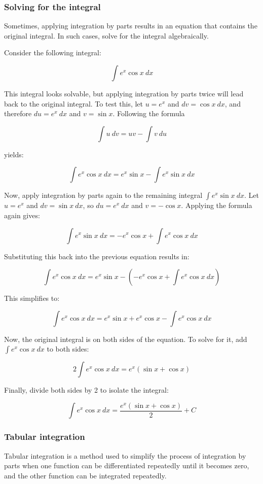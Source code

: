 \documentclass[letterpaper, 12pt]{article}
\begin{document}
\subsubsection*{Solving for the integral}

Sometimes, applying integration by parts results in an equation that contains the original integral. In such cases, solve for the integral algebraically.

Consider the following integral:

$$\int e^x \cos x \: dx$$

This integral looks solvable, but applying integration by parts twice will lead back to the original integral. To test this, let $u = e^x$ and $dv = \cos x \: dx$, and therefore $du = e^x \: dx$ and $v = \sin x$. Following the formula 

$$ \int u \: dv = uv - \int v \: du $$

yields:

$$ \int e^x \cos x \: dx = e^x \sin x - \int e^x \sin x \: dx $$

Now, apply integration by parts again to the remaining integral $\int e^x \sin x \: dx$. Let $u = e^x$ and $dv = \sin x \: dx$, so $du = e^x \: dx$ and $v = -\cos x$. Applying the formula again gives:

$$ \int e^x \sin x \: dx = -e^x \cos x + \int e^x \cos x \: dx $$

Substituting this back into the previous equation results in:

$$ \int e^x \cos x \: dx = e^x \sin x - \left( -e^x \cos x + \int e^x \cos x \: dx \right) $$

This simplifies to:

$$ \int e^x \cos x \: dx = e^x \sin x + e^x \cos x - \int e^x \cos x \: dx $$

Now, the original integral is on both sides of the equation. To solve for it, add $\int e^x \cos x \: dx$ to both sides:

$$ 2 \int e^x \cos x \: dx = e^x (\sin x + \cos x) $$

Finally, divide both sides by 2 to isolate the integral:

$$ \int e^x \cos x \: dx = \boxed{\frac{e^x (\sin x + \cos x)}{2} + C} $$

\subsubsection*{Tabular integration}

Tabular integration is a method used to simplify the process of integration by parts when one function can be differentiated repeatedly until it becomes zero, and the other function can be integrated repeatedly.
\end{document}
